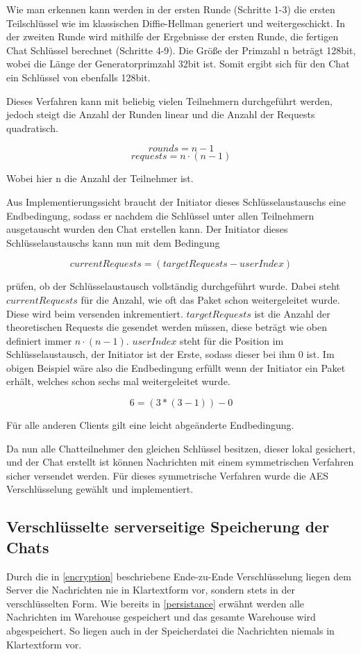 Wie man erkennen kann werden in der ersten Runde (Schritte 1-3) die ersten Teilschlüssel wie im klassischen Diffie-Hellman generiert und weitergeschickt. In der zweiten Runde wird mithilfe der Ergebnisse der ersten Runde, die fertigen Chat Schlüssel berechnet (Schritte 4-9). Die Größe der Primzahl n beträgt 128bit, wobei die Länge der Generatorprimzahl 32bit ist. Somit ergibt sich für den Chat ein Schlüssel von ebenfalls 128bit.

\newpage

Dieses Verfahren kann mit beliebig vielen Teilnehmern durchgeführt
werden, jedoch steigt die Anzahl der Runden linear und die Anzahl der 
Requests quadratisch.

$$ rounds = n - 1 $$
$$ requests = n \cdot (n - 1) $$

Wobei hier n die Anzahl der Teilnehmer ist.

Aus Implementierungssicht braucht der Initiator dieses
Schlüsselaustauschs eine Endbedingung, sodass er nachdem
die Schlüssel unter allen Teilnehmern ausgetauscht wurden 
den Chat erstellen kann. Der Initiator dieses Schlüsselaustauschs 
kann nun mit dem Bedingung

$$ currentRequests = (targetRequests - userIndex) $$

prüfen, ob der Schlüsselaustausch vollständig durchgeführt wurde. Dabei steht 
$ currentRequests $ für die Anzahl, wie oft das Paket schon weitergeleitet
wurde. Diese wird beim versenden inkrementiert. $ targetRequests $
ist die Anzahl der theoretischen Requests die gesendet werden müssen, diese
beträgt wie oben definiert immer $ n \cdot (n - 1) $. $ userIndex $ steht
für die Position im Schlüsselaustausch, der Initiator ist der Erste, sodass
dieser bei ihm 0 ist. Im obigen Beispiel wäre also die Endbedingung
erfüllt wenn der Initiator ein Paket erhält, welches schon sechs mal 
weitergeleitet wurde.

$$ 6 = (3 * (3 - 1)) - 0 $$

Für alle anderen Clients gilt eine leicht abgeänderte Endbedingung.

Da nun alle Chatteilnehmer den gleichen Schlüssel besitzen, dieser 
lokal gesichert, und der Chat erstellt ist können Nachrichten mit 
einem symmetrischen Verfahren sicher versendet werden. Für dieses 
symmetrische Verfahren wurde die AES Verschlüsselung gewählt und
implementiert.

\author{Troy Keßler}
\subsection{Verschlüsselte serverseitige Speicherung der Chats}
Durch die in \ref{encryption} beschriebene Ende-zu-Ende Verschlüsselung liegen dem Server die Nachrichten nie in Klartextform vor, sondern stets in der verschlüsselten Form. Wie bereits in \ref{persistance} erwähnt werden alle Nachrichten im Warehouse gespeichert und das gesamte Warehouse wird abgespeichert. So liegen auch in der Speicherdatei die Nachrichten niemals in Klartextform vor.
